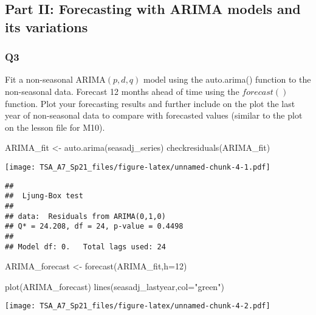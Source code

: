 \documentclass[
]{article}
\newenvironment{Shaded}{\begin{snugshade}}{\end{snugshade}}
\newcommand{\AttributeTok}[1]{\textcolor[rgb]{0.77,0.63,0.00}{#1}}
\newcommand{\DecValTok}[1]{\textcolor[rgb]{0.00,0.00,0.81}{#1}}
\newcommand{\FunctionTok}[1]{\textcolor[rgb]{0.00,0.00,0.00}{#1}}
\newcommand{\NormalTok}[1]{#1}
\newcommand{\OtherTok}[1]{\textcolor[rgb]{0.56,0.35,0.01}{#1}}
\newcommand{\StringTok}[1]{\textcolor[rgb]{0.31,0.60,0.02}{#1}}
\begin{document}
\hypertarget{part-ii-forecasting-with-arima-models-and-its-variations}{%
\subsection{Part II: Forecasting with ARIMA models and its
variations}\label{part-ii-forecasting-with-arima-models-and-its-variations}}

\hypertarget{q3}{%
\subsubsection{Q3}\label{q3}}

Fit a non-seasonal ARIMA\((p,d,q)\) model using the auto.arima()
function to the non-seasonal data. Forecast 12 months ahead of time
using the \(forecast()\) function. Plot your forecasting results and
further include on the plot the last year of non-seasonal data to
compare with forecasted values (similar to the plot on the lesson file
for M10).

\begin{Shaded}
\begin{Highlighting}[]
\NormalTok{ARIMA\_fit }\OtherTok{\textless{}{-}} \FunctionTok{auto.arima}\NormalTok{(seasadj\_series)}
\FunctionTok{checkresiduals}\NormalTok{(ARIMA\_fit)}
\end{Highlighting}
\end{Shaded}

\texttt{[image: TSA\_A7\_Sp21\_files/figure-latex/unnamed-chunk-4-1.pdf]}

\begin{verbatim}
## 
##  Ljung-Box test
## 
## data:  Residuals from ARIMA(0,1,0)
## Q* = 24.208, df = 24, p-value = 0.4498
## 
## Model df: 0.   Total lags used: 24
\end{verbatim}

\begin{Shaded}
\begin{Highlighting}[]
\NormalTok{ARIMA\_forecast }\OtherTok{\textless{}{-}} \FunctionTok{forecast}\NormalTok{(ARIMA\_fit,}\AttributeTok{h=}\DecValTok{12}\NormalTok{)}

\FunctionTok{plot}\NormalTok{(ARIMA\_forecast)}
\FunctionTok{lines}\NormalTok{(seasadj\_lastyear,}\AttributeTok{col=}\StringTok{"green"}\NormalTok{)}
\end{Highlighting}
\end{Shaded}

\texttt{[image: TSA\_A7\_Sp21\_files/figure-latex/unnamed-chunk-4-2.pdf]}
\end{document}
